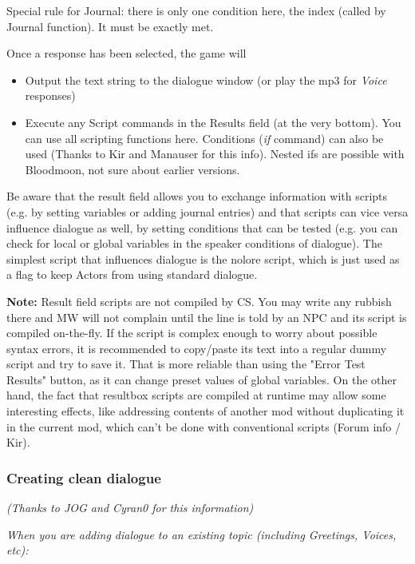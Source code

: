 Special rule for Journal: there is only one condition here, the index
(called by Journal function). It must be exactly met.

Once a response has been selected, the game will

\begin{itemize}
\item
  Output the text string to the dialogue window (or play the mp3 for
  \emph{Voice} responses)
\item
  Execute any Script commands in the Results field (at the very bottom).
  You can use all scripting functions here. Conditions (\emph{if}
  command) can also be used (Thanks to Kir and Manauser for this info).
  Nested ifs are possible with Bloodmoon, not sure about earlier
  versions.
\end{itemize}

Be aware that the result field allows you to exchange information with
scripts (e.g. by setting variables or adding journal entries) and that
scripts can vice versa influence dialogue as well, by setting conditions
that can be tested (e.g. you can check for local or global variables in
the speaker conditions of dialogue). The simplest script that influences
dialogue is the nolore script, which is just used as a flag to keep
Actors from using standard dialogue.

\textbf{Note:} Result field scripts are not compiled by CS. You may
write any rubbish there and MW will not complain until the line is told
by an NPC and its script is compiled on-the-fly. If the script is
complex enough to worry about possible syntax errors, it is recommended
to copy/paste its text into a regular dummy script and try to save it.
That is more reliable than using the "Error Test Results" button, as it
can change preset values of global variables. On the other hand, the
fact that resultbox scripts are compiled at runtime may allow some
interesting effects, like addressing contents of another mod without
duplicating it in the current mod, which can't be done with conventional
scripts (Forum info / Kir).

\hypertarget{creating-clean-dialogue}{%
\subsubsection{Creating clean dialogue}\label{creating-clean-dialogue}}

\emph{(Thanks to JOG and Cyran0 for this information)}

\emph{When you are adding dialogue to an existing topic (including
Greetings, Voices, etc):}


